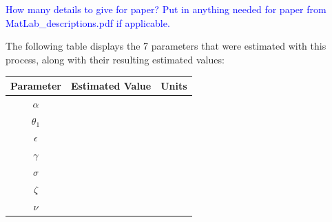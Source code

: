 \documentclass[12pt]{article}
\begin{document}
\textcolor{blue}{How many details to give for paper? Put in anything needed for paper from MatLab\_descriptions.pdf if applicable.}




The following table displays the 7 parameters that were estimated with this process, along with their resulting estimated values: 



\begin{center}

\begin{tabular}{|c | c | c|}

 \hline

{Parameter} & {Estimated Value} & {Units} \\ [0.5ex]

 \hline\hline

$\alpha$ &  &  \\

\hline

$\theta_1$&  &  \\

\hline

$\epsilon$ &  &  \\

\hline

$\gamma$ &  &  \\

\hline


$\sigma$ &  &  \\

\hline

$\zeta$ &  &  \\


\hline

$\nu$ &  &  \\

 \hline

\end{tabular}

\end{center}
 
\end{document}

